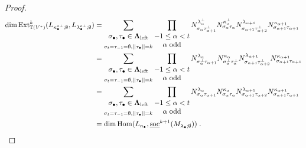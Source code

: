 \documentclass[12pt]{article}
\def\TT {{\mathbb T}}     %
\def\ul  {\underline}
\begin{document}
\begin{proof}
\begin{align*}
\dim {\rm Ext}_{\TT(V^*)}^k (L_{\kappa_\bullet^{o\perp};\emptyset},L_{\lambda_\bullet^{o\perp};\emptyset}) & = \sum\limits_{\begin{matrix}\sigma_\bullet,\tau_\bullet\in\bm\Lambda_{\rm left}\\{_{ \sigma_t=\tau_{-1}=\emptyset,||\tau_\bullet||=k}} \end{matrix}} \prod\limits_{\begin{matrix}-1\leq\alpha<t\\ \alpha\;{\rm odd}\end{matrix}} N^{\lambda_\alpha^\perp}_{\sigma_\alpha \tau_{\alpha+1}^\perp} N^{\kappa_\alpha^\perp}_{\sigma_\alpha \tau_\alpha} N^{\lambda_{\alpha+1}}_{\sigma_{\alpha+1} \tau_{\alpha+2}^\perp} N^{\kappa_{\alpha+1}}_{\sigma_{\alpha+1} \tau_{\alpha+1}} \\
& = \sum\limits_{\begin{matrix}\sigma_\bullet,\tau_\bullet\in\bm\Lambda_{\rm left}\\ {_{\sigma_t=\tau_{-1}=\emptyset,||\tau_\bullet||=k}} \end{matrix}} \prod\limits_{\begin{matrix}-1\leq\alpha<t\\ \alpha\;{\rm odd}\end{matrix}} N^{\lambda_\alpha}_{\sigma_\alpha^\perp \tau_{\alpha+1}} N^{\kappa_\alpha}_{\sigma_\alpha^\perp \tau_\alpha^\perp} N^{\lambda_{\alpha+1}}_{\sigma_{\alpha+1} \tau_{\alpha+2}^\perp} N^{\kappa_{\alpha+1}}_{\sigma_{\alpha+1} \tau_{\alpha+1}} \\
& = \sum\limits_{\begin{matrix}\sigma_\bullet,\tau_\bullet\in\bm\Lambda_{\rm left}\\ {_{\sigma_t=\tau_{-1}=\emptyset,||\tau_\bullet||=k}} \end{matrix}} \prod\limits_{\begin{matrix}-1\leq\alpha<t\\ \alpha\;{\rm odd}\end{matrix}} N^{\lambda_\alpha}_{\sigma_\alpha \tau_{\alpha+1}} N^{\kappa_\alpha}_{\sigma_\alpha \tau_\alpha} N^{\lambda_{\alpha+1}}_{\sigma_{\alpha+1} \tau_{\alpha+2}} N^{\kappa_{\alpha+1}}_{\sigma_{\alpha+1} \tau_{\alpha+1}} \\
& = \dim {\rm Hom}(L_{\kappa_\bullet},\ul{\rm soc}^{k+1}(M_{\lambda_\bullet;\emptyset})) \;.
\end{align*}
\end{proof}
\end{document}
